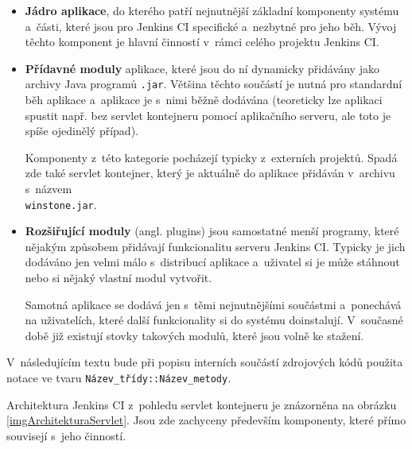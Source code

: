             \begin{itemize}
                \item{\textbf{Jádro aplikace}, do kterého patří nejnutnější základní komponenty systému
                    a~části, které jsou pro Jenkins CI specifické a~nezbytné pro jeho běh. 
                    Vývoj těchto komponent je hlavní činností v~rámci celého projektu Jenkins CI.}

                \item{\textbf{Přídavné moduly} aplikace, které jsou do ní dynamicky přidávány jako archivy Java programů
                    \texttt{.jar}. Většina těchto součástí je nutná pro standardní běh aplikace a~aplikace je s~nimi 
                    běžně dodávána (teoreticky lze
                    aplikaci spustit např. bez servlet kontejneru pomocí aplikačního serveru, ale toto je spíše ojedinělý případ). 
                    
                    Komponenty z~této kategorie pocházejí typicky z~externích projektů.
                    Spadá zde také servlet kontejner, který je aktuálně do aplikace
                    přidáván v~archivu s~názvem \\\texttt{winstone.jar}.}

                \item{\textbf{Rozšiřující moduly} (angl. plugins) jsou samostatné menší programy, které nějakým
                    způsobem přidávají funkcionalitu serveru Jenkins CI. Typicky je jich dodáváno jen velmi málo
                    s~distribucí aplikace 
                    a~uživatel si je může stáhnout nebo si nějaký vlastní modul vytvořit.
                    
                    Samotná aplikace se dodává jen s~těmi nejnutnějšími součástmi a~ponechává na uživatelích, které
                    další funkcionality si do systému doinstalují. V~současné době již existují stovky takových
                    modulů, které jsou volně ke stažení. }
            \end{itemize}
            

            V~následujícím textu bude při popisu interních součástí zdrojových kódů použita notace
            ve tvaru \texttt{Název\_třídy::Název\_metody}.

            Architektura Jenkins CI z~pohledu servlet kontejneru je znázorněna na obrázku \ref{imgArchitekturaServlet}.
            Jsou zde zachyceny především komponenty, které přímo souvisejí s~jeho činností.

